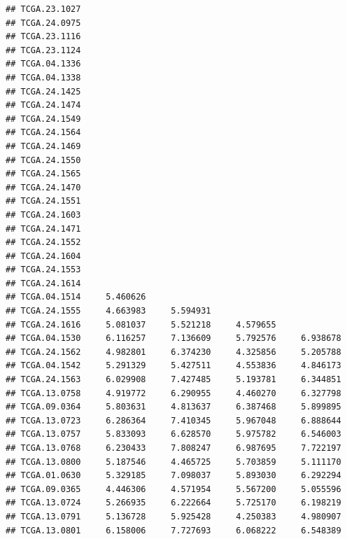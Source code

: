 \documentclass[UTF8]{beamer}\usepackage[]{graphicx}\usepackage[]{color}
\makeatletter
\newenvironment{kframe}{%
 \def\at@end@of@kframe{}%
 \ifinner\ifhmode%
  \def\at@end@of@kframe{\end{minipage}}%
  \begin{minipage}{\columnwidth}%
 \fi\fi%
 \def\FrameCommand##1{\hskip\@totalleftmargin \hskip-\fboxsep
 \colorbox{shadecolor}{##1}\hskip-\fboxsep
     \hskip-\linewidth \hskip-\@totalleftmargin \hskip\columnwidth}%
 \MakeFramed {\advance\hsize-\width
   \@totalleftmargin\z@ \linewidth\hsize
   \@setminipage}}%
 {\par\unskip\endMakeFramed%
 \at@end@of@kframe}
\newenvironment{knitrout}{}{} %
\makeatother
\begin{document}
\begin{frame}[fragile]
\begin{knitrout}
\begin{kframe}
\begin{verbatim}
## TCGA.23.1027                                                    
## TCGA.24.0975                                                    
## TCGA.23.1116                                                    
## TCGA.23.1124                                                    
## TCGA.04.1336                                                    
## TCGA.04.1338                                                    
## TCGA.24.1425                                                    
## TCGA.24.1474                                                    
## TCGA.24.1549                                                    
## TCGA.24.1564                                                    
## TCGA.24.1469                                                    
## TCGA.24.1550                                                    
## TCGA.24.1565                                                    
## TCGA.24.1470                                                    
## TCGA.24.1551                                                    
## TCGA.24.1603                                                    
## TCGA.24.1471                                                    
## TCGA.24.1552                                                    
## TCGA.24.1604                                                    
## TCGA.24.1553                                                    
## TCGA.24.1614                                                    
## TCGA.04.1514     5.460626                                       
## TCGA.24.1555     4.663983     5.594931                          
## TCGA.24.1616     5.081037     5.521218     4.579655             
## TCGA.04.1530     6.116257     7.136609     5.792576     6.938678
## TCGA.24.1562     4.982801     6.374230     4.325856     5.205788
## TCGA.04.1542     5.291329     5.427511     4.553836     4.846173
## TCGA.24.1563     6.029908     7.427485     5.193781     6.344851
## TCGA.13.0758     4.919772     6.290955     4.460270     6.327798
## TCGA.09.0364     5.803631     4.813637     6.387468     5.899895
## TCGA.13.0723     6.286364     7.410345     5.967048     6.888644
## TCGA.13.0757     5.833093     6.628570     5.975782     6.546003
## TCGA.13.0768     6.230433     7.808247     6.987695     7.722197
## TCGA.13.0800     5.187546     4.465725     5.703859     5.111170
## TCGA.01.0630     5.329185     7.098037     5.893030     6.292294
## TCGA.09.0365     4.446306     4.571954     5.567200     5.055596
## TCGA.13.0724     5.266935     6.222664     5.725170     6.198219
## TCGA.13.0791     5.136728     5.925428     4.250383     4.980907
## TCGA.13.0801     6.158006     7.727693     6.068222     6.548389

\end{verbatim}
\end{kframe}
\end{knitrout}
\end{frame}
\end{document}

